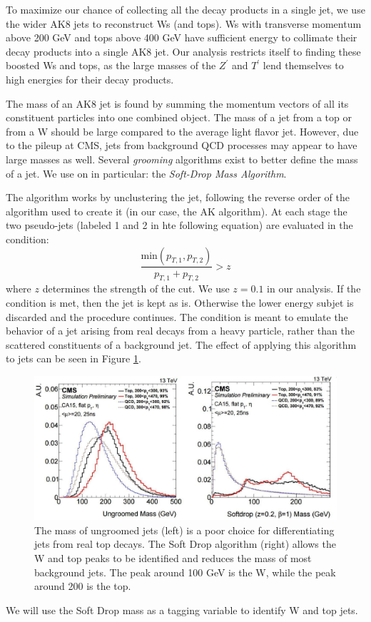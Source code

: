 {To maximize our chance of collecting all the decay products in a single jet, we use the wider AK8 jets to reconstruct Ws (and tops). Ws with transverse momentum above 200 GeV and tops above 400 GeV have sufficient energy to collimate their decay products into a single AK8 jet. Our analysis restricts itself to finding these boosted Ws and tops, as the large masses of the $Z^\prime$ and $T^\prime$ lend themselves to high energies for their decay products.

The mass of an AK8 jet is found by summing the momentum vectors of all its constituent particles into one combined object. The mass of a jet from a top or from a W should be large compared to the average light flavor jet. However, due to the pileup at CMS, jets from background QCD processes may appear to have large masses as well. Several \textit{grooming} algorithms exist to better define the mass of a jet. We use on in particular: the \textit{Soft-Drop Mass Algorithm}\cite{Larkoski:2014wba}.

The algorithm works by unclustering the jet, following the reverse order of the algorithm used to create it (in our case, the AK algorithm). At each stage the two pseudo-jets (labeled 1 and 2 in hte following equation) are evaluated in the condition:
\begin{equation}
   \frac{\textrm{min}(p_{T,1},p_{T,2})}{p_{T,1} + p_{T,2}} > z
\end{equation}
where $z$ determines the strength of the cut. We use $z=0.1$ in our analysis. If the condition is met, then the jet is kept as is. Otherwise the lower energy subjet is discarded and the procedure continues. The condition is meant to emulate the behavior of a jet arising from real decays from a heavy particle, rather than the scattered constituents of a background jet. The effect of applying this algorithm to jets can be seen in Figure \ref{Fig:Tag:SD}.
\begin{figure}[h!]
    \centering
        \includegraphics[width=\textwidth]{F4/JetMassChange}
        \caption{The mass of ungroomed jets (left) is a poor choice for differentiating jets from real top decays. The Soft Drop algorithm (right) allows the W and top peaks to be identified and reduces the mass of most background jets. The peak around 100 GeV is the W, while the peak around 200 is the top.}
        \label{Fig:Tag:SD}
\end{figure}
We will use the Soft Drop mass as a tagging variable to identify W and top jets.
}
